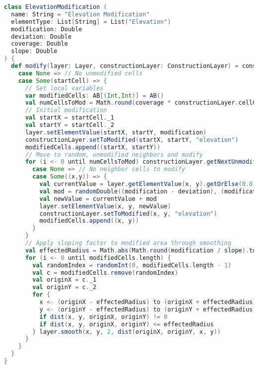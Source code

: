 \begin{lstlisting}[language=Scala]
class ElevationModification (
  name: String = "Elevation Modification"
  elementType: List[String] = List("Elevation")
  modification: Double
  deviation: Double
  coverage: Double
  slope: Double
) {
  def modify(layer: Layer, constructionLayer: ConstructionLayer) = constructionLayer.getRandomUnmodified() match {
    case None => // No unmodified cells
    case Some(startCell) => {
      // Set local variables
      var modifiedCells: AB[(Int,Int)] = AB()
      val numCellsToMod = Math.round(coverage * constructionLayer.cellCount).toInt
      // Initial modification
      val startX = startCell._1
      val startY = startCell._2
      layer.setElementValue(startX, startY, modification)
      constructionLayer.setToModified(startX, startY, "elevation")
      modifiedCells.append((startX, startY))
      // Move to random, unmodified neighbors and modify
      for (i <- 0 until numCellsToMod) constructionLayer.getNextUnmodifiedNeighbor(modifiedCells) match {
        case None => // No neighbor cells to modify
        case Some((x,y)) => {
          val currentValue = layer.getElementValue(x, y).getOrElse(0.0)
          val mod = randomDouble((modification - deviation), (modification + deviation))
          val newValue = currentValue + mod
          layer.setElementValue(x, y, newValue)
          constructionLayer.setToModified(x, y, "elevation")
          modifiedCells.append((x, y))
        }
      }
      // Apply sloping factor to modified area through smoothing
      val effectedRadius = Math.abs(Math.round(modification / slope).toInt)
      for (i <- 0 until modifiedCells.length) {
        val randomIndex = randomInt(0, modifiedCells.length - 1)
        val c = modifiedCells.remove(randomIndex)
        val originX = c._1
        val originY = c._2
        for {
          x <- (originX - effectedRadius) to (originX + effectedRadius)
          y <- (originY - effectedRadius) to (originY + effectedRadius)
          if dist(x, y, originX, originY) != 0
          if dist(x, y, originX, originY) <= effectedRadius
        } layer.smooth(x, y, 2, dist(originX, originY, x, y))
      }
    }
  }
}
\end{lstlisting}

